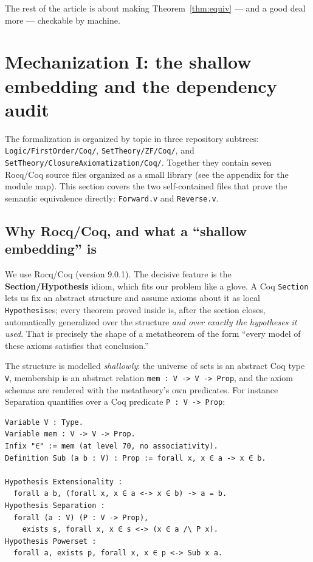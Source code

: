 \documentclass[11pt]{article}
\theoremstyle{plain}
\theoremstyle{definition}
\newcommand{\cq}[1]{\lstinline[basicstyle=\ttfamily]|#1|}
\begin{document}
The rest of the article is about making Theorem~\ref{thm:equiv} --- and a good deal
more --- checkable by machine.

\section{Mechanization I: the shallow embedding and the dependency audit}\label{sec:mech-shallow}

The formalization is organized by topic in three repository subtrees:
\texttt{Logic/FirstOrder/Coq/}, \texttt{SetTheory/ZF/Coq/}, and
\texttt{SetTheory/ClosureAxiomatization/Coq/}.  Together they contain seven
Rocq/Coq source files organized as a small library (see the appendix for the
module map). This section covers the two self-contained files that prove the
semantic equivalence directly: \texttt{Forward.v} and \texttt{Reverse.v}.

\subsection{Why Rocq/Coq, and what a ``shallow embedding'' is}

We use Rocq/Coq (version 9.0.1). The decisive feature is the
\textbf{Section/Hypothesis} idiom, which fits our problem like a glove. A Coq
\cq{Section} lets us fix an abstract structure and assume axioms about it as local
\cq{Hypothesis}es; every theorem proved inside is, after the section closes,
automatically generalized over the structure \emph{and over exactly the hypotheses
it used}. That is precisely the shape of a metatheorem of the form ``every model of
these axioms satisfies that conclusion.''

The structure is modelled \emph{shallowly}: the universe of sets is an abstract Coq
type \cq{V}, membership is an abstract relation \cq{mem : V -> V -> Prop}, and the
axiom schemas are rendered with the metatheory's own predicates. For instance
Separation quantifies over a Coq predicate \cq{P : V -> Prop}:

\begin{lstlisting}
Variable V : Type.
Variable mem : V -> V -> Prop.
Infix "∈" := mem (at level 70, no associativity).
Definition Sub (a b : V) : Prop := forall x, x ∈ a -> x ∈ b.

Hypothesis Extensionality :
  forall a b, (forall x, x ∈ a <-> x ∈ b) -> a = b.
Hypothesis Separation :
  forall (a : V) (P : V -> Prop),
    exists s, forall x, x ∈ s <-> (x ∈ a /\ P x).
Hypothesis Powerset :
  forall a, exists p, forall x, x ∈ p <-> Sub x a.
\end{lstlisting}
\end{document}
